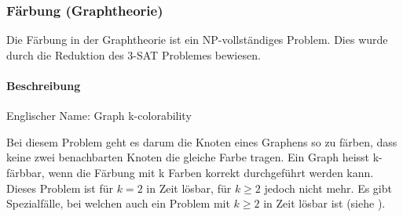 	\subsubsection{Färbung (Graphtheorie)}\label{colarability_graph_theory}
	Die Färbung in der Graphtheorie ist ein NP-vollständiges Problem. Dies wurde durch die Reduktion des 3-SAT Problemes bewiesen.

	\paragraph{Beschreibung}
	Englischer Name: Graph k-colorability

	Bei diesem Problem geht es darum die Knoten eines Graphens so zu färben, dass keine zwei benachbarten Knoten die gleiche Farbe tragen. Ein Graph heisst k-färbbar, wenn die 
Färbung mit k Farben korrekt durchgeführt werden kann. Dieses Problem ist für $k = 2$ in  Zeit lösbar, für $k \ge 2$ jedoch nicht mehr. Es gibt Spezialfälle, 
bei welchen auch ein Problem mit $k \ge 2$ in  Zeit lösbar ist (siehe \cite{garey1979computers}).

